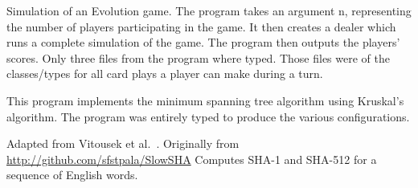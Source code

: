 Simulation of an Evolution game. The program takes an argument n, representing the
number of players participating in the game. It then creates a dealer which runs a complete
simulation of the game. The program then outputs the players' scores.
Only three files from the program where typed. Those files were of the classes/types  for all
 card plays a player can make during a turn.


This program implements the minimum spanning tree algorithm using Kruskal's algorithm.
The program was entirely typed to produce the various configurations.

Adapted from Vitousek et al.~\cite{vksb-dls-2014}. Originally from \url {http://github.com/sfstpala/SlowSHA}  Computes SHA-1  and SHA-512 for a sequence of
English words. 


